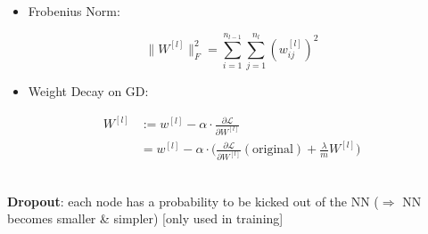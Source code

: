 \documentclass[
]{book}
\providecommand{\tightlist}{%
  \setlength{\itemsep}{0pt}\setlength{\parskip}{0pt}}
\begin{document}
\begin{itemize}
\tightlist
\item
  Frobenius Norm:
\end{itemize}

\[\begin{equation}
\|W^{[l]}\|^2_F=\sum_{i=1}^{n_{l-1}}\sum_{j=1}^{n_l}{(w_{ij}^{[l]})^2}
\end{equation}\]

\begin{itemize}
\tightlist
\item
  Weight Decay on GD:
\end{itemize}

\[\begin{align}
W^{[l]}&:=w^{[l]}-\alpha\cdot\frac{\partial{\mathcal{L}}}{\partial{W^{[l]}}} \\
&=w^{[l]}-\alpha\cdot\Big(\frac{\partial{\mathcal{L}}}{\partial{W^{[l]}}}(\text{original})+\frac{\lambda}{m}W^{[l]}\Big)
\end{align}\]

~\\
\textbf{Dropout}: each node has a probability to be kicked out of the NN
(\(\Rightarrow\) NN becomes smaller \& simpler) {[}only used in
training{]}
\end{document}
